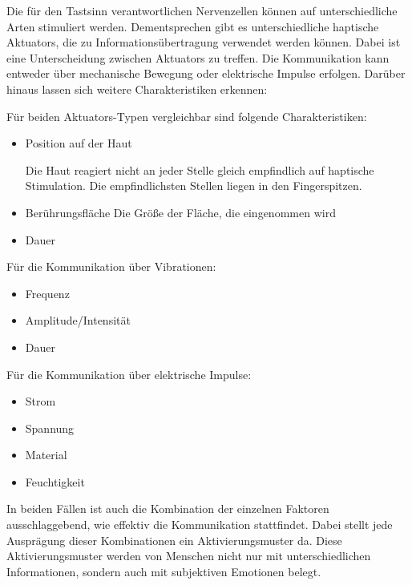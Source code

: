 \documentclass{llncs}					%
\begin{document}
Die für den Tastsinn verantwortlichen Nervenzellen können auf unterschiedliche Arten stimuliert werden. Dementsprechen gibt es unterschiedliche haptische \glspl{Aktuator}, die zu Informationsübertragung verwendet werden können. Dabei ist eine Unterscheidung zwischen \glspl{Aktuator} zu treffen. Die Kommunikation kann entweder über mechanische Bewegung oder elektrische Impulse erfolgen. Darüber hinaus lassen sich weitere Charakteristiken erkennen:

Für beiden \glspl{Aktuator}-Typen vergleichbar sind folgende Charakteristiken:
\begin{itemize}
	\item Position auf der Haut
	
	Die Haut reagiert nicht an jeder Stelle gleich empfindlich auf haptische Stimulation\cite[S.~91]{doi:10.1518/001872008X250638}.
	Die empfindlichsten Stellen liegen in den Fingerspitzen.
	\item Berührungsfläche
	Die Größe der Fläche, die eingenommen wird
	\item Dauer
\end{itemize}

Für die Kommunikation über Vibrationen\cite{doi:10.1518/001872008X250638}:
\begin{itemize}
	\item Frequenz
	
	\item Amplitude/Intensität %
	\item Dauer
\end{itemize}

Für die Kommunikation über elektrische Impulse\cite[S.~4]{68204}:
\begin{itemize}
	\item Strom
	\item Spannung
	\item Material
	\item Feuchtigkeit
\end{itemize}

In beiden Fällen ist auch die Kombination der einzelnen Faktoren ausschlaggebend, wie effektiv die Kommunikation stattfindet. Dabei stellt jede Ausprägung dieser Kombinationen ein Aktivierungsmuster da. Diese Aktivierungsmuster werden von Menschen nicht nur mit unterschiedlichen Informationen, sondern auch mit subjektiven Emotionen belegt\cite{5444662}.%
\end{document}
